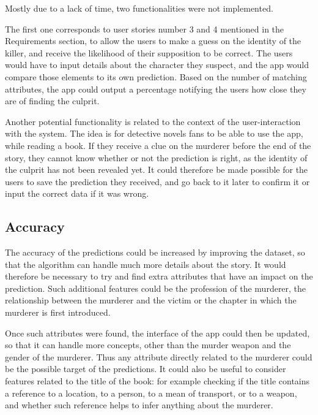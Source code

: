 \documentclass{mproj}
\begin{document}
\hspace{5mm} Mostly due to a lack of time, two functionalities were not implemented.\par

The first one corresponds to user stories number 3 and 4 mentioned in the Requirements section, to allow the users to make a guess on the identity of the killer, and receive the likelihood of their supposition to be correct. The users would have to input details about the character they suspect, and the app would compare those elements to its own prediction. Based on the number of matching attributes, the app could output a percentage notifying the users how close they are of finding the culprit. \par

Another potential functionality is related to the context of the user-interaction with the system. The idea is for detective novels fans to be able to use the app, while reading a book. If they receive a clue on the murderer before the end of the story, they cannot know whether or not the prediction is right, as the identity of the culprit has not been revealed yet. It could therefore be made possible for the users to save the prediction they received, and go back to it later to confirm it or input the correct data if it was wrong.

\subsection*{Accuracy}

The accuracy of the predictions could be increased by improving the dataset, so that the algorithm can handle much more details about the story. It would therefore be necessary to try and find extra attributes that have an impact on the prediction. Such additional features could be the profession of the murderer, the relationship between the murderer and the victim or the chapter in which the murderer is first introduced. \par

Once such attributes were found, the interface of the app could then be updated, so that it can handle more concepts, other than the murder weapon and the gender of the murderer. Thus any attribute directly related to the murderer could be the possible target of the predictions.
It could also be useful to consider features related to the title of the book: for example checking if the title contains a reference to a location, to a person, to a mean of transport, or to a weapon, and whether such reference helps to infer anything about the murderer.
	
\end{document}
